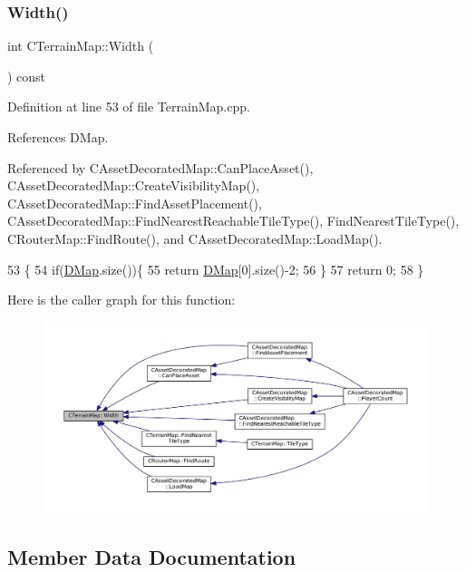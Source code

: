 \subsubsection{\texorpdfstring{Width()}{Width()}}
{\footnotesize\ttfamily int C\+Terrain\+Map\+::\+Width (\begin{DoxyParamCaption}{ }\end{DoxyParamCaption}) const}



Definition at line 53 of file Terrain\+Map.\+cpp.



References D\+Map.



Referenced by C\+Asset\+Decorated\+Map\+::\+Can\+Place\+Asset(), C\+Asset\+Decorated\+Map\+::\+Create\+Visibility\+Map(), C\+Asset\+Decorated\+Map\+::\+Find\+Asset\+Placement(), C\+Asset\+Decorated\+Map\+::\+Find\+Nearest\+Reachable\+Tile\+Type(), Find\+Nearest\+Tile\+Type(), C\+Router\+Map\+::\+Find\+Route(), and C\+Asset\+Decorated\+Map\+::\+Load\+Map().


\begin{DoxyCode}
53                             \{
54     \textcolor{keywordflow}{if}(\hyperlink{classCTerrainMap_a80d154ce478948b10473534a7bca13f6}{DMap}.size())\{
55         \textcolor{keywordflow}{return} \hyperlink{classCTerrainMap_a80d154ce478948b10473534a7bca13f6}{DMap}[0].size()-2;
56     \}
57     \textcolor{keywordflow}{return} 0;
58 \}
\end{DoxyCode}
Here is the caller graph for this function\+:\nopagebreak
\begin{figure}[H]
\begin{center}
\leavevmode
\includegraphics[width=350pt]{classCTerrainMap_a34cb754aa9b26e85a73377159f2527d7_icgraph}
\end{center}
\end{figure}


\subsection{Member Data Documentation}
\hypertarget{classCTerrainMap_a80d154ce478948b10473534a7bca13f6}{}\label{classCTerrainMap_a80d154ce478948b10473534a7bca13f6} 
